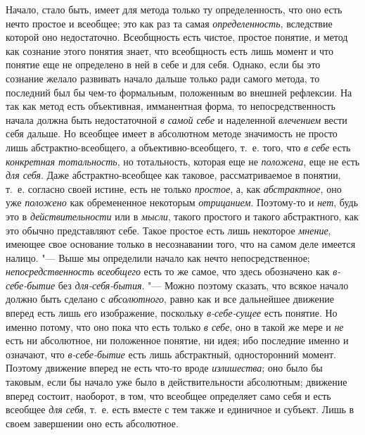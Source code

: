 Начало, стало быть, имеет для метода только ту определенность, что оно
есть нечто простое и всеобщее; это как раз та самая {\em определенность},
вследствие которой оно недостаточно. Всеобщность есть чистое,
простое понятие, и метод как сознание этого понятия знает, что всеобщность
есть лишь момент и что понятие еще не определено в ней в себе и для себя.
Однако, если бы это сознание желало развивать начало дальше только ради
самого метода, то последний был бы чем-то формальным, положенным во внешней
рефлексии. На так как метод есть объективная, имманентная форма, то
непосредственность начала должна быть недостаточной
{\em в самой себе} и наделенной {\em влечением}
вести себя дальше. Но всеобщее имеет в абсолютном методе
значимость не просто лишь абстрактно-всеобщего, а объективно-всеобщего,
т.~е. того, что {\em в себе} есть {\em конкретная
тотальность}, но тотальность, которая еще не
{\em положена}, еще не есть {\em для себя}. Даже
абстрактно-всеобщее как таковое, рассматриваемое в понятии, т.~е. согласно
своей истине, есть не только {\em простое}, а, как {\em абстрактное}, оно
уже {\em положено} как обремененное некоторым {\em отрицанием}.
Поэтому-то и {\em нет}, будь это в {\em действительности} или в {\em мысли},
такого простого и такого абстрактного, как это обычно
представляют себе. Такое простое есть лишь некоторое {\em мнение}, имеющее
свое основание только в несознавании того, что на самом деле имеется
налицо. "--- Выше мы определили начало как нечто непосредственное;
{\em непосредственность всеобщего}
есть то же самое, что здесь обозначено как
{\em в-себе-бытие} без {\em для-себя-бытия}. "--- Можно поэтому
сказать, что всякое начало должно быть сделано с {\em абсолютного},
равно как и все дальнейшее движение вперед есть лишь его
изображение, поскольку {\em в-себе-сущее} есть
понятие. Но именно потому, что оно пока что есть только
{\em в себе}, оно в такой же мере и {\em не} есть
ни абсолютное, ни положенное понятие, ни идея; ибо последние именно и
означают, что {\em в-себе-бытие}
есть лишь абстрактный, односторонний момент. Поэтому движение
вперед не есть что-то вроде {\em излишества}; оно
было бы таковым, если бы начало уже было в действительности абсолютным;
движение вперед состоит, наоборот, в том, что всеобщее определяет само себя
и есть всеобщее {\em для себя},
т.~е. есть вместе с тем также и единичное и субъект. Лишь в
своем завершении оно есть абсолютное.

